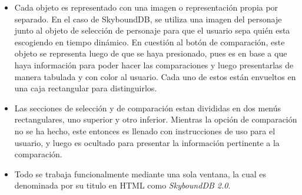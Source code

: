 \begin{itemize}
\begin{itemize}
    \end{itemize}
    \item Cada objeto es representado con una imagen o representación propia por separado. En el caso de SkyboundDB, se utiliza una imagen del personaje junto al objeto de selección de personaje para que el usuario sepa quién esta escogiendo en tiempo dinámico. En cuestión al botón de comparación, este objeto se representa luego de que se haya presionado, pues es en base a que haya información para poder hacer las comparaciones y luego presentarlas de manera tabulada y con color al usuario. Cada uno de estos están envueltos en una caja rectangular para distinguirlos.
    \item Las secciones de selección y de comparación estan divididas en dos menús rectangulares, uno superior y otro inferior. Mientras la opción de comparación no se ha hecho, este entonces es llenado con instrucciones de uso para el usuario, y luego es ocultado para presentar la información pertinente a la comparación.
    \item Todo se trabaja funcionalmente mediante una sola ventana, la cual es denominada por su titulo en HTML como \textit{SkyboundDB 2.0}.
\end{itemize}

